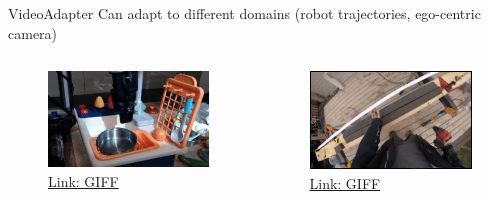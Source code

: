 \begin{frame}[allowframebreaks]{VideoAdapter}
\framebreak
Can adapt to different domains (robot trajectories, ego-centric camera)
\begin{columns}
    \begin{figure}
        \centering
        \includegraphics[width=\linewidth,height=\textheight,keepaspectratio]{images/adv-img-gen/slide_167_1_img.png}
        \caption*{\href{https://drive.google.com/file/d/1l3UCX-6TzMOqymeQwu3aYdPopSxV64cr/view?usp=sharing}{Link: GIFF}}
    \end{figure}
    \begin{figure}
        \centering
        \includegraphics[width=\linewidth,height=\textheight,keepaspectratio]{images/adv-img-gen/slide_167_2_img.png}
        \caption*{\href{https://drive.google.com/file/d/15EoGTelZTxyMg6kLnoQc2PmlkRn1OTB8/view?usp=sharing}{Link: GIFF}}
    \end{figure}
\end{columns}
\end{frame}